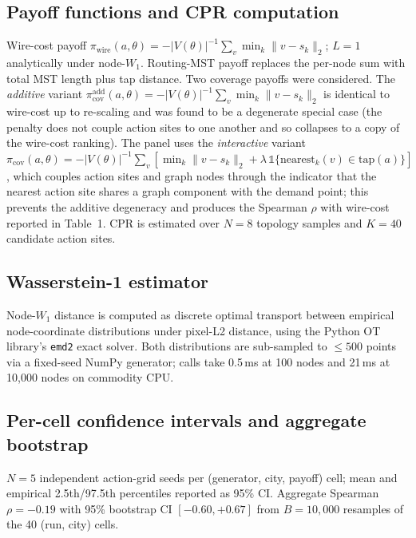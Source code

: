 \documentclass[10pt,a4paper]{article}
\begin{document}
\subsection{Payoff functions and CPR computation}

Wire-cost payoff
$\pi_{\text{wire}}(a, \theta) = -|V(\theta)|^{-1} \sum_v \min_k \|v - s_k\|_2$;
$L = 1$ analytically under node-$W_1$. Routing-MST payoff replaces
the per-node sum with total MST length plus tap distance. Two
coverage payoffs were considered. The \emph{additive} variant
$\pi_{\text{cov}}^{\text{add}}(a, \theta) = -|V(\theta)|^{-1}
\sum_v \min_k \|v - s_k\|_2$ is identical to wire-cost up to
re-scaling and was found to be a degenerate special case (the
penalty does not couple action sites to one another and so collapses
to a copy of the wire-cost ranking). The panel uses the
\emph{interactive} variant
$\pi_{\text{cov}}(a, \theta) = -|V(\theta)|^{-1} \sum_v
[\min_k \|v - s_k\|_2 + \lambda \,\mathbb{1}\{\text{nearest}_k(v) \in
\text{tap}(a)\}]$,
which couples action sites and graph nodes through the indicator
that the nearest action site shares a graph component with the
demand point; this prevents the additive degeneracy and produces
the Spearman $\rho$ with wire-cost reported in Table~1. CPR is
estimated over $N = 8$ topology samples and $K = 40$ candidate
action sites.

\subsection{Wasserstein-1 estimator}

Node-$W_1$ distance is computed as discrete optimal transport
between empirical node-coordinate distributions under pixel-L2
distance, using the Python OT library's \texttt{emd2} exact solver.
Both distributions are sub-sampled to $\le 500$ points via a
fixed-seed NumPy generator; calls take 0.5\,ms at 100 nodes and
21\,ms at 10,000 nodes on commodity CPU.

\subsection{Per-cell confidence intervals and aggregate bootstrap}

$N = 5$ independent action-grid seeds per (generator, city,
payoff) cell; mean and empirical 2.5th/97.5th percentiles reported
as 95\% CI. Aggregate Spearman $\rho = -0.19$ with 95\% bootstrap
CI $[-0.60, +0.67]$ from $B = 10{,}000$ resamples of the 40 (run,
city) cells.
\end{document}
